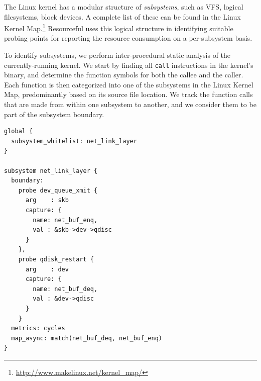 \documentclass[12pt,twoside,a4paper]{article}
\newcommand{\pname}{Resourceful}
\newcommand{\lnote}[1]{\textcolor{red}{[\textit{#1}]}} %
\begin{document}
The Linux kernel has a modular structure of \emph{subsystems}, such as VFS,
logical filesystems, block devices. A complete list of these can be found in
the Linux Kernel Map.\footnote{\url{http://www.makelinux.net/kernel_map/}} \pname{ }uses this logical structure in identifying suitable probing points for
reporting the resource consumption on a per-subsystem basis.



To identify subsystems, we perform inter-procedural static analysis of the
currently-running kernel. We start by finding all \texttt{call} instructions in
the kernel's binary, and determine the function symbols for both the callee and
the caller. Each function is then categorized into one of the subsystems in the
Linux Kernel Map, predominantly based on its source file location. We track the
function calls that are made from within one subsystem to another, and we
consider them to be part of the subsystem boundary.

\vspace{1em}
\lstset{style=customc, captionpos=b}
\begin{lstlisting}[caption={Sample configuration file defining a custom subsystem},label={lst:config}]
global {
  subsystem_whitelist: net_link_layer
}

subsystem net_link_layer {
  boundary:
    probe dev_queue_xmit {
      arg    : skb
      capture: {
        name: net_buf_enq,
        val : &skb->dev->qdisc
      }
    },
    probe qdisk_restart {
      arg    : dev
      capture: {
        name: net_buf_deq,
        val : &dev->qdisc
      }
    }
  metrics: cycles
  map_async: match(net_buf_deq, net_buf_enq)
}
\end{lstlisting}
\end{document}
